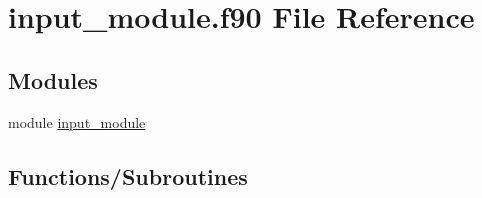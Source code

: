 \hypertarget{input__module_8f90}{}\section{input\+\_\+module.\+f90 File Reference}
\label{input__module_8f90}
\subsection*{Modules}
\begin{DoxyCompactItemize}
\item 
module \hyperlink{namespaceinput__module}{input\+\_\+module}
\end{DoxyCompactItemize}
\subsection*{Functions/\+Subroutines}
